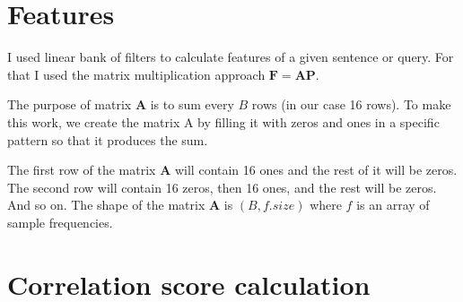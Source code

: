 \documentclass[11pt]{article}
\begin{document}
\section{Features}
\par
I used linear bank of filters to calculate features of a given sentence or query. For that I used the matrix multiplication approach $\mathbf{F} = \mathbf{AP}$. 
\par
The purpose of matrix $\mathbf{A}$ is to sum every $B$ rows (in our case 16 rows). To make this work, we create the matrix A by filling it with zeros and ones in a specific pattern so that it produces the sum.
\par 
The first row of the matrix $\mathbf{A}$ will contain 16 ones and the rest of it will be zeros. The second row will contain 16 zeros, then 16 ones, and the rest will be zeros. And so on. 
The shape of the matrix $\mathbf{A}$ is $(B, f.size)$ where $f$ is an array of sample frequencies.

\section{Correlation score calculation}
\end{document}
